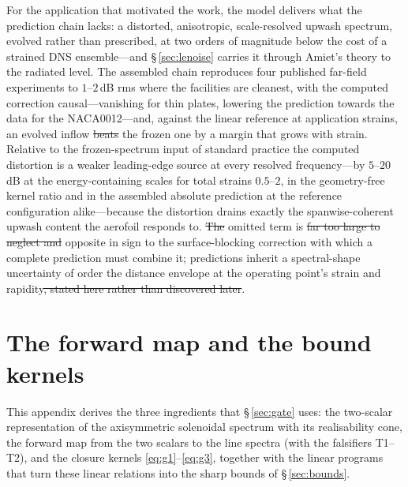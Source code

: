 \documentclass[lineno]{JFM-FLM_Au}
\providecommand{\DIFadd}[1]{{\protect\color{blue}\uwave{#1}}} %
\providecommand{\DIFdel}[1]{{\protect\color{red}\sout{#1}}} %
\providecommand{\DIFaddbegin}{} %
\providecommand{\DIFaddend}{} %
\providecommand{\DIFdelbegin}{} %
\providecommand{\DIFdelend}{} %
\begin{document}
For the application that motivated the work, the model delivers what
the prediction chain lacks: a distorted, anisotropic, scale-resolved
upwash spectrum, evolved rather than prescribed, at two orders of
magnitude below the cost of a strained DNS ensemble---and
\S\,\ref{sec:lenoise} carries it through Amiet's theory to the
radiated level. The assembled chain reproduces four published far-field experiments to
$1$--$2$\,dB rms where the facilities are cleanest, with the computed
correction causal---vanishing for thin plates, lowering the
prediction towards the data for the NACA0012---and, against the linear
reference at application strains, an evolved inflow \DIFdelbegin \DIFdel{beats }\DIFdelend \DIFaddbegin \DIFadd{improves on }\DIFaddend the frozen one by a margin that grows with strain. Relative to the
frozen-spectrum input of standard practice the computed distortion is
a weaker leading-edge source at every resolved frequency---by
$5$--$20$\,dB at the energy-containing scales for total strains
$0.5$--$2$, in the geometry-free kernel ratio and in the assembled
absolute prediction at the reference configuration alike---because the
distortion drains exactly the spanwise-coherent upwash content the
aerofoil responds to. \DIFdelbegin \DIFdel{The }\DIFdelend \DIFaddbegin \DIFadd{This }\DIFaddend omitted term is \DIFdelbegin \DIFdel{far too large to neglect and }\DIFdelend opposite in sign to the surface-blocking correction with which a complete prediction must combine it; predictions inherit a spectral-shape uncertainty of order
the distance envelope at the operating point's strain and rapidity\DIFdelbegin \DIFdel{,
stated here rather than discovered later}\DIFdelend .

\appendix
\section{The forward map and the bound kernels}\label{app:forward}

This appendix derives the three ingredients that \S\,\ref{sec:gate} uses:
the two-scalar representation of the axisymmetric solenoidal spectrum with
its realisability cone, the forward map from the two scalars to the line
spectra (with the falsifiers T1--T2), and the closure kernels
\eqref{eq:g1}--\eqref{eq:g3}, together with the linear programs that turn
these linear relations into the sharp bounds of \S\,\ref{sec:bounds}.
\end{document}
